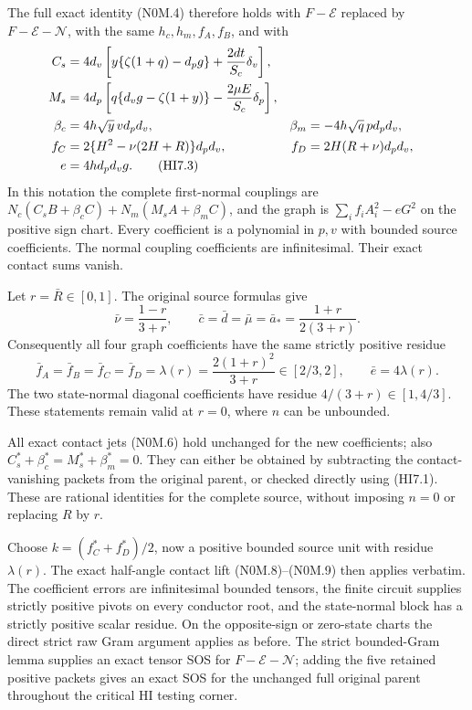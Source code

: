 The full exact identity (N0M.4) therefore holds with
$F-\mathcal E$ replaced by $F-\mathcal E-\mathcal N$, with the same
$h_c,h_m,f_A,f_B$, and with
\begin{align}
 C_s&=4d_v\left[y\{\zeta(1+q)-d_pg\}
                       +\frac{2dt}{S_c}\delta_v\right],\notag\\
 M_s&=4d_p\left[q\{d_vg-\zeta(1+y)\}
                       -\frac{2\mu E}{S_c}\delta_p\right],\notag\\
 \beta_c&=4h\sqrt y\,v d_pd_v,
 &\beta_m&=-4h\sqrt q\,p d_pd_v,\notag\\
 f_C&=2\{H^2-\nu(2H+R)\}d_pd_v,
 &f_D&=2H(R+\nu)d_pd_v,\notag\\
 e&=4h d_pd_vg.                                  \tag{HI7.3}
\end{align}
In this notation the complete first-normal couplings are
$N_c(C_sB+\beta_cC)+N_m(M_sA+\beta_mC)$, and the graph is
$\sum_i f_iA_i^2-eG^2$ on the positive sign chart. Every coefficient
is a polynomial in $p,v$ with bounded source coefficients. The normal
coupling coefficients are infinitesimal. Their exact contact sums vanish.

Let $r=\bar R\in[0,1]$. The original source formulas give
\[
 \bar\nu=\frac{1-r}{3+r},\qquad
 \bar c=\bar d=\bar\mu=\bar a_*
        =\frac{1+r}{2(3+r)}.
\]
Consequently all four graph coefficients have the same strictly positive
residue
\[
 \bar f_A=\bar f_B=\bar f_C=\bar f_D
       =\lambda(r)=\frac{2(1+r)^2}{3+r}\in[2/3,2],
 \qquad \bar e=4\lambda(r).                       \tag{HI7.4}
\]
The two state-normal diagonal coefficients have residue
$4/(3+r)\in[1,4/3]$.
These statements remain valid at $r=0$, where $n$ can be unbounded.

All exact contact jets (N0M.6) hold unchanged for the new coefficients;
also $C_s^*+\beta_c^*=M_s^*+\beta_m^*=0$. They can either be obtained
by subtracting the contact-vanishing packets from the original parent,
or checked directly using (HI7.1). These are rational identities for the complete source, without imposing
$n=0$ or replacing $R$ by $r$.

Choose $k=(f_C^*+f_D^*)/2$, now a positive bounded source unit with
residue $\lambda(r)$. The exact half-angle contact lift (N0M.8)--(N0M.9)
then applies verbatim. The coefficient errors are infinitesimal bounded
tensors, the finite circuit supplies strictly positive pivots on every
conductor root, and the state-normal block has a strictly positive
scalar residue. On
the opposite-sign or zero-state charts the direct strict raw Gram
argument applies as before. The strict bounded-Gram lemma supplies an
exact tensor SOS for $F-\mathcal E-\mathcal N$; adding the five retained
positive packets gives an exact SOS for the unchanged full original
parent throughout the critical HI testing corner.

